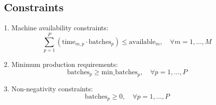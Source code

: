 \documentclass{article}
\begin{document}
\subsection*{Constraints}

1. Machine availability constraints:
\[
\sum_{p=1}^{P} (\text{time}_{m,p} \cdot \text{batches}_{p}) \leq \text{available}_{m}, \quad \forall m = 1, \ldots, M
\]

2. Minimum production requirements:
\[
\text{batches}_{p} \geq \text{min\_batches}_{p}, \quad \forall p = 1, \ldots, P
\]

3. Non-negativity constraints:
\[
\text{batches}_{p} \geq 0, \quad \forall p = 1, \ldots, P
\]
\end{document}

